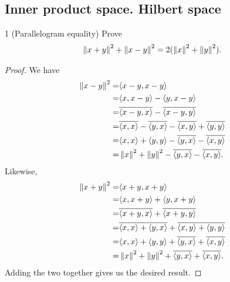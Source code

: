 \subsection{Inner product space. Hilbert space}


\begin{exercise}{1 (Parallelogram equality)}
Prove
\begin{align*}
    \left\lVert x+y\right\rVert^2 + \left\lVert x-y\right\rVert^2 
    = 2(\left\lVert x\right\rVert^2 + \left\lVert y\right\rVert^2).
\end{align*}
\end{exercise}
\begin{proof}
We have
\begin{align*}
    \left\lVert x-y\right\rVert^2
    =& \langle x-y, x-y\rangle\\
    =& \langle x, x-y\rangle - \langle y, x-y\rangle\\
    =& \overline{\langle x-y, x\rangle} - \overline{\langle x-y,y\rangle}\\
    =& \overline{\langle x, x\rangle} - \overline{\langle y, x\rangle} - \overline{\langle x,y\rangle} + \overline{\langle y,y\rangle}\\
    =& \langle x, x\rangle + \langle y,y\rangle - \overline{\langle y, x\rangle} - \overline{\langle x,y\rangle} \\
    =& \left\lVert x\right\rVert^2 +\left\lVert y\right\rVert^2 - \overline{\langle y, x\rangle} - \overline{\langle x,y\rangle}.
\end{align*}
Likewise,
\begin{align*}
    \left\lVert x+y\right\rVert^2
    =& \langle x+y, x+y\rangle\\
    =& \langle x, x+y\rangle + \langle y, x+y\rangle\\
    =& \overline{\langle x+y, x\rangle} + \overline{\langle x+y,y\rangle}\\
    =& \overline{\langle x, x\rangle + \langle y, x\rangle} + \overline{\langle x,y\rangle + \langle y,y\rangle}\\
    =& \langle x, x\rangle + \langle y,y\rangle + \overline{\langle y, x\rangle} + \overline{\langle x,y\rangle} \\
    =& \left\lVert x\right\rVert^2 +\left\lVert y\right\rVert^2 + \overline{\langle y, x\rangle} + \overline{\langle x,y\rangle}.
\end{align*}
Adding the two together gives us the desired result.
\end{proof}

